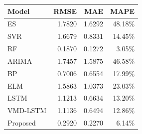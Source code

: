 {\tiny\setlength{\tabcolsep}{2pt}\begin{tabular}{lrrr} \toprule
Model & RMSE & MAE & MAPE \\ \midrule
ES & 1.7820 & 1.6292 & 48.18\% \\ 
SVR & 1.6679 & 0.8331 & 14.45\% \\ 
RF & 0.1870 & 0.1272 & 3.05\% \\ 
ARIMA & 1.7457 & 1.5875 & 46.58\% \\ 
BP & 0.7006 & 0.6554 & 17.99\% \\ 
ELM & 1.5863 & 1.0373 & 23.03\% \\ 
LSTM & 1.1213 & 0.6634 & 13.20\% \\ 
VMD-LSTM & 1.1136 & 0.6494 & 12.86\% \\ 
Proposed & 0.2920 & 0.2270 & 6.14\% \\ 
\bottomrule \end{tabular}}
